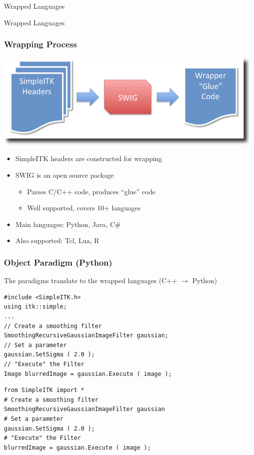 \begin{frame}{Wrapped Languages}
\fontsize{36pt}{36pt}\selectfont
\center
\begin{center}
Wrapped Languages
\end{center}
\end{frame}

\begin{frame}[fragile]
\frametitle{Wrapping Process}
\begin{center}
  \includegraphics[width=.8\textwidth]{Images/WrappingProcess_shadow}
\end{center}
\begin{itemize}
  \item SimpleITK headers are constructed for wrapping
  \item SWIG is an open source package
  \begin{itemize}
    \item Parses C/C++ code, produces ``glue'' code
    \item Well supported, covers 10+ languages
  \end{itemize}
  \item Main languages: Python, Java, C\#
  \item Also supported: Tcl, Lua, R
\end{itemize}
\end{frame}

\begin{frame}[fragile]
\frametitle{Object Paradigm (Python)}
The paradigms translate to the wrapped languages (C++ $\rightarrow$ Python)
\lstcpp
\begin{lstlisting}
#include <SimpleITK.h>
using itk::simple;
...
// Create a smoothing filter
SmoothingRecursiveGaussianImageFilter gaussian;
// Set a parameter
gaussian.SetSigma ( 2.0 );
// "Execute" the Filter
Image blurredImage = gaussian.Execute ( image );
\end{lstlisting}
\lstpython
\begin{lstlisting}
from SimpleITK import *
# Create a smoothing filter
SmoothingRecursiveGaussianImageFilter gaussian
# Set a parameter
gaussian.SetSigma ( 2.0 );
# "Execute" the Filter
blurredImage = gaussian.Execute ( image );
\end{lstlisting}
\end{frame}

